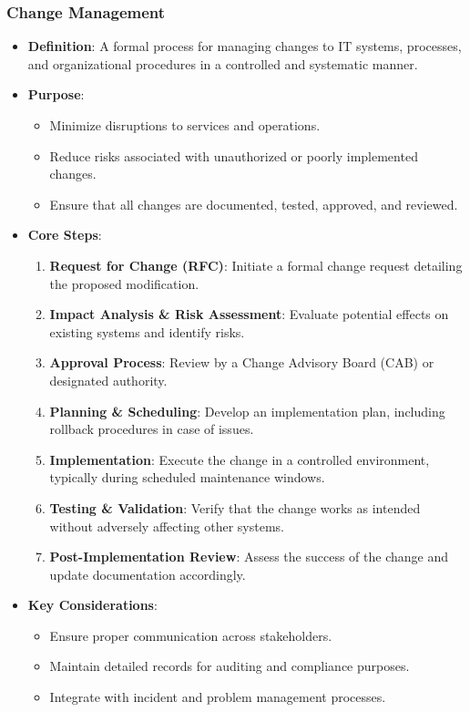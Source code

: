 \documentclass[11pt]{article}
\begin{document}
\subsubsection{Change Management}
\label{sec:org7fd4b3e}
\begin{itemize}
\item \textbf{Definition}: A formal process for managing changes to IT systems, processes, and organizational procedures in a controlled and systematic manner.
\item \textbf{Purpose}:
\begin{itemize}
\item Minimize disruptions to services and operations.
\item Reduce risks associated with unauthorized or poorly implemented changes.
\item Ensure that all changes are documented, tested, approved, and reviewed.
\end{itemize}
\item \textbf{Core Steps}:
\begin{enumerate}
\item \textbf{\textbf{Request for Change (RFC)}}: Initiate a formal change request detailing the proposed modification.
\item \textbf{\textbf{Impact Analysis \& Risk Assessment}}: Evaluate potential effects on existing systems and identify risks.
\item \textbf{\textbf{Approval Process}}: Review by a Change Advisory Board (CAB) or designated authority.
\item \textbf{\textbf{Planning \& Scheduling}}: Develop an implementation plan, including rollback procedures in case of issues.
\item \textbf{\textbf{Implementation}}: Execute the change in a controlled environment, typically during scheduled maintenance windows.
\item \textbf{\textbf{Testing \& Validation}}: Verify that the change works as intended without adversely affecting other systems.
\item \textbf{\textbf{Post-Implementation Review}}: Assess the success of the change and update documentation accordingly.
\end{enumerate}
\item \textbf{Key Considerations}:
\begin{itemize}
\item Ensure proper communication across stakeholders.
\item Maintain detailed records for auditing and compliance purposes.
\item Integrate with incident and problem management processes.
\end{itemize}
\end{itemize}
\end{document}
